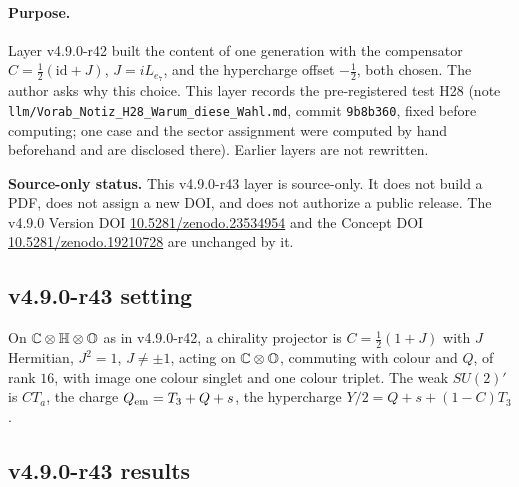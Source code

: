 \paragraph{Purpose.}
Layer v4.9.0-r42 built the content of one generation with the compensator \(C=\tfrac12(\mathrm{id}+J)\), \(J=iL_{e_7}\), and the hypercharge
offset \(-\tfrac12\), both chosen.  The author asks why this choice.  This layer records the pre-registered test H28 (note
\texttt{llm/Vorab\_Notiz\_H28\_Warum\_diese\_Wahl.md}, commit \texttt{9b8b360}, fixed before computing; one case and the sector
assignment were computed by hand beforehand and are disclosed there).  Earlier layers are not rewritten.

\noindent\textbf{Source-only status.}
This v4.9.0-r43 layer is source-only.  It does not build a PDF, does not assign a new DOI,
and does not authorize a public release.  The v4.9.0 Version DOI
\href{https://doi.org/10.5281/zenodo.23534954}{10.5281/zenodo.23534954} and the Concept DOI
\href{https://doi.org/10.5281/zenodo.19210728}{10.5281/zenodo.19210728} are unchanged by it.

\subsection*{v4.9.0-r43 setting}
\label{subsec:v490-r43-setting}

On \(\mathbb C\otimes\mathbb{H}\otimes\mathbb{O}\) as in v4.9.0-r42, a chirality projector is \(C=\tfrac12(1+J)\) with \(J\) Hermitian, \(J^2=1\), \(J\neq\pm1\),
acting on \(\mathbb C\otimes\mathbb{O}\), commuting with colour and \(Q\), of rank \(16\), with image one colour singlet and one colour triplet.  The weak
\(SU(2)'\) is \(CT_a\), the charge \(Q_{\rm em}=T_3+Q+s\), the hypercharge \(Y/2=Q+s+(1-C)T_3\).

\subsection*{v4.9.0-r43 results}
\label{subsec:v490-r43-results}

